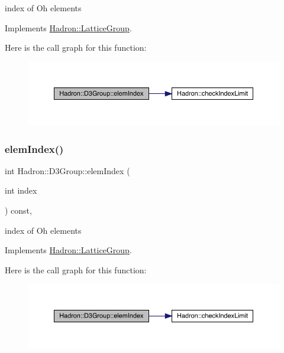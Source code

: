 index of Oh elements 

Implements \mbox{\hyperlink{structHadron_1_1LatticeGroup_afb8e3ee60de059f75bce1044c694e1e8}{Hadron\+::\+Lattice\+Group}}.

Here is the call graph for this function\+:
\nopagebreak
\begin{figure}[H]
\begin{center}
\leavevmode
\includegraphics[width=350pt]{de/de1/structHadron_1_1D3Group_a90ac88df35dd8e919637917dc22ee903_cgraph}
\end{center}
\end{figure}
\mbox{\label{structHadron_1_1D3Group_a90ac88df35dd8e919637917dc22ee903}} 
\subsubsection{\texorpdfstring{elemIndex()}{elemIndex()}\hspace{0.1cm}{\footnotesize\ttfamily [3/3]}}
{\footnotesize\ttfamily int Hadron\+::\+D3\+Group\+::elem\+Index (\begin{DoxyParamCaption}\item[{int}]{index }\end{DoxyParamCaption}) const\hspace{0.3cm}{\ttfamily [inline]}, {\ttfamily [virtual]}}

index of Oh elements 

Implements \mbox{\hyperlink{structHadron_1_1LatticeGroup_afb8e3ee60de059f75bce1044c694e1e8}{Hadron\+::\+Lattice\+Group}}.

Here is the call graph for this function\+:
\nopagebreak
\begin{figure}[H]
\begin{center}
\leavevmode
\includegraphics[width=350pt]{de/de1/structHadron_1_1D3Group_a90ac88df35dd8e919637917dc22ee903_cgraph}
\end{center}
\end{figure}
\mbox{\label{structHadron_1_1D3Group_a60e24b1e2d17481b7ab94860c95ce155}} 
